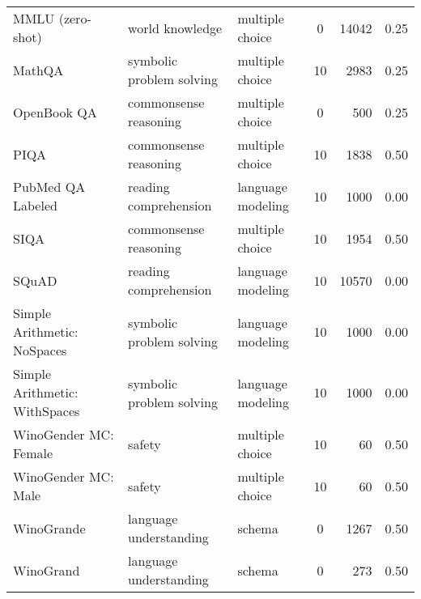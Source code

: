 \begin{table}[t!]
\begin{tabular}{lllcrc}
MMLU (zero-shot)~\cite{mmlu} & world knowledge & multiple choice & 0 & 14042 & 0.25\\
MathQA~\cite{mathqa} & symbolic problem solving & multiple choice & 10 & 2983 & 0.25\\
OpenBook QA~\cite{OpenBookQA2018} & commonsense reasoning & multiple choice & 0 & 500 & 0.25\\
PIQA~\cite{piqa} & commonsense reasoning & multiple choice & 10 & 1838 & 0.50\\
PubMed QA Labeled~\cite{pubmed} & reading comprehension & language modeling & 10 & 1000 & 0.00\\
SIQA~\cite{siqa} & commonsense reasoning & multiple choice & 10 & 1954 & 0.50\\
SQuAD~\cite{squad} & reading comprehension & language modeling & 10 & 10570 & 0.00\\
Simple Arithmetic: NoSpaces~\cite{mosaicml} & symbolic problem solving & language modeling & 10 & 1000 & 0.00\\
Simple Arithmetic: WithSpaces~\cite{mosaicml} & symbolic problem solving & language modeling & 10 & 1000 & 0.00\\
WinoGender MC: Female~\cite{winogender} & safety & multiple choice & 10 & 60 & 0.50\\
WinoGender MC: Male~\cite{winogender} & safety & multiple choice & 10 & 60 & 0.50\\
WinoGrande~\cite{sakaguchi2019winogrande} & language understanding & schema & 0 & 1267 & 0.50\\
WinoGrand~\cite{winograd} & language understanding & schema & 0 & 273 & 0.50\\
\bottomrule
\end{tabular}
\label{tab:eval_info}
\end{table}